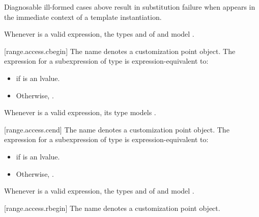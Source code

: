 \pnum
\begin{note}
Diagnosable ill-formed cases above
result in substitution failure when 
appears in the immediate context of a template instantiation.
\end{note}

\pnum
\begin{note}
Whenever  is a valid expression,
the types  and  of
 and 
model .
\end{note}

[range.access.cbegin]{}
\pnum
The name  denotes a customization point
object. The expression
 for a subexpression  of type 
is expression-equivalent to:
\begin{itemize}
\item {} if  is an lvalue.
\item Otherwise, .
\end{itemize}

\pnum
\begin{note}
Whenever  is a valid expression, its type models
.
\end{note}

[range.access.cend]{}
\pnum
The name  denotes a customization point
object. The expression
 for a subexpression  of type 
is expression-equivalent to:
\begin{itemize}
\item {} if  is an lvalue.
\item Otherwise, .
\end{itemize}

\pnum
\begin{note}
Whenever  is a valid expression,
the types  and  of
 and 
model .
\end{note}

[range.access.rbegin]{}
\pnum
The name  denotes a customization point
object.

